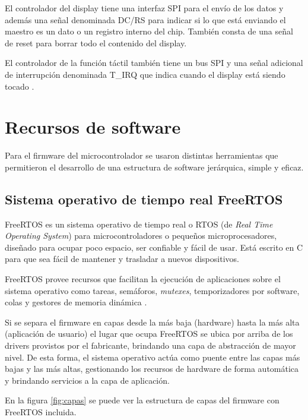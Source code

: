 El controlador del display tiene una interfaz SPI para el envío de los datos y además una señal denominada DC/RS para indicar si lo que está enviando el maestro es un dato o un registro interno del chip. También consta de una señal de reset para borrar todo el contenido del display.

El controlador de la función táctil también tiene un bus SPI y una señal adicional de interrupción denominada T\_IRQ que indica cuando el display está siendo tocado \citep{MSP2807}.

\section{Recursos de software}

Para el firmware del microcontrolador se usaron distintas herramientas que permitieron el desarrollo de una estructura de software jerárquica, simple y eficaz.

\subsection{Sistema operativo de tiempo real FreeRTOS}

FreeRTOS es un sistema operativo de tiempo real o RTOS (de \textit{Real Time Operating System}) para microcontroladores o pequeños microprocesadores, diseñado para ocupar poco espacio, ser confiable y fácil de usar. Está escrito en C para que sea fácil de mantener y trasladar a nuevos dispositivos.

FreeRTOS provee recursos que facilitan la ejecución de aplicaciones sobre el sistema operativo como tareas, semáforos, \textit{mutexes}, temporizadores por software, colas y gestores de memoria dinámica \citep{WEBSITE:1}.

Si se separa el firmware en capas desde la más baja (hardware) hasta la más alta (aplicación de usuario) el lugar que ocupa FreeRTOS se ubica por arriba de los drivers provistos por el fabricante, brindando una capa de abstracción de mayor nivel. De esta forma, el sistema operativo actúa como puente entre las capas más bajas y las más altas, gestionando los recursos de hardware de forma automática y brindando servicios a la capa de aplicación.

En la figura \ref{fig:capas} se puede ver la estructura de capas del firmware con FreeRTOS incluida.

